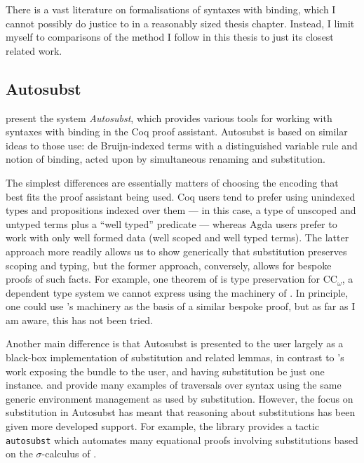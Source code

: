 There is a vast literature on formalisations of syntaxes with binding, which I
cannot possibly do justice to in a reasonably sized thesis chapter.
Instead, I limit myself to comparisons of the \citet{AACMM21} method I follow in
this thesis to just its closest related work.

\subsection{Autosubst}

\citet{Autosubst15} present the system \emph{Autosubst}, which provides various
tools for working with syntaxes with binding in the Coq proof assistant.
Autosubst is based on similar ideas to those \citeauthor{AACMM21} use:
de Bruijn-indexed terms with a distinguished variable rule and notion of
binding, acted upon by simultaneous renaming and substitution.

The simplest differences are essentially matters of choosing the encoding that
best fits the proof assistant being used.
Coq users tend to prefer using unindexed types and propositions indexed over
them --- in this case, a type of unscoped and untyped terms plus a
``well typed'' predicate --- whereas Agda users prefer to work with only well
formed data (well scoped and well typed terms).
The latter approach more readily allows us to show generically that substitution
preserves scoping and typing, but the former approach, conversely, allows for
bespoke proofs of such facts.
For example, one theorem of \citet{Autosubst15} is type preservation for
$\mathrm{CC}_\omega$, a dependent type system we cannot express using the
machinery of \citet{AACMM21}.
In principle, one could use \citeauthor{AACMM21}'s machinery as the basis of a
similar bespoke proof, but as far as I am aware, this has not been tried.

Another main difference is that Autosubst is presented to the user largely as
a black-box implementation of substitution and related lemmas, in contrast to
\citeauthor{AACMM21}'s work exposing the  bundle to the
user, and having substitution be just one instance.
\citet{ACMM17} and \citet{AACMM21} provide many examples of traversals over
syntax using the same generic environment management as used by substitution.
However, the focus on substitution in Autosubst has meant that reasoning about
substitutions has been given more developed support.
For example, the library provides a tactic \texttt{autosubst} which automates
many equational proofs involving substitutions based on the $\sigma$-calculus of
\citet{ACCL91}.

